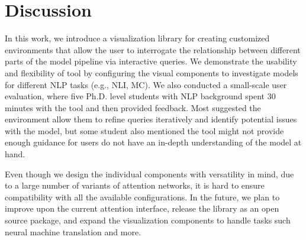 \section{Discussion}
In this work, we introduce a visualization library for creating customized environments that allow the user to interrogate the relationship between different parts of the model pipeline via interactive queries.
%
We demonstrate the usability and flexibility of tool by configuring the visual components to investigate models for different NLP tasks (e.g., NLI, MC).
%
We also conducted a small-scale user evaluation, where five Ph.D. level students with NLP background spent 30 minutes with the tool and then provided feedback. Most suggested the environment allow them to refine queries iteratively and identify potential issues with the model, but some student also mentioned the tool might not provide enough guidance for users do not have an in-depth understanding of the model at hand.

Even though we design the individual components with versatility in mind, due to a large number of variants of attention networks, it is hard to ensure compatibility with all the available configurations.
%
In the future, we plan to improve upon the current attention interface, release the library as an open source package, and expand the visualization components to handle tasks such neural machine translation and more. 
